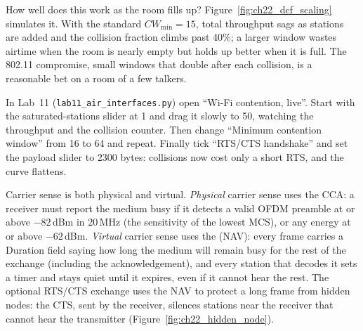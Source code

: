 How well does this work as the room fills up? Figure~\ref{fig:ch22_dcf_scaling} simulates it. With
the standard $CW_{\min}=15$, total throughput sags as stations are added and the collision fraction
climbs past 40\%; a larger window wastes airtime when the room is nearly empty but holds up better
when it is full. The 802.11 compromise, small windows that double after each collision, is a
reasonable bet on a room of a few talkers.


\begin{tryit}
In Lab~11 (\texttt{lab11\_air\_interfaces.py}) open ``Wi-Fi contention, live''. Start with the
saturated-stations slider at 1 and drag it slowly to 50, watching the throughput and the collision
counter. Then change ``Minimum contention window'' from 16 to 64 and repeat. Finally tick ``RTS/CTS
handshake'' and set the payload slider to 2300 bytes: collisions now cost only a short RTS, and the
curve flattens.
\end{tryit}

Carrier sense is both physical and virtual. \emph{Physical} carrier sense uses the CCA: a receiver
must report the medium busy if it detects a valid OFDM preamble at or above $-82$\,dBm in 20\,MHz
(the sensitivity of the lowest MCS), or any energy at or above $-62$\,dBm. \emph{Virtual} carrier
sense uses the  (NAV): every frame carries a Duration field saying
how long the medium will remain busy for the rest of the exchange (including the acknowledgement),
and every station that decodes it sets a timer and stays quiet until it expires, even if it cannot
hear the rest. The optional RTS/CTS exchange uses the NAV to protect a long frame from hidden nodes:
the CTS, sent by the receiver, silences stations near the receiver that cannot hear the
transmitter (Figure~\ref{fig:ch22_hidden_node}).

